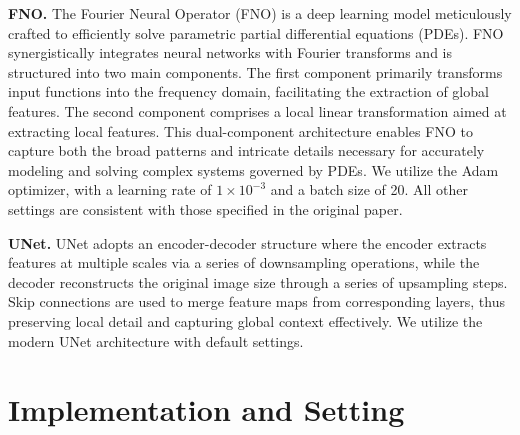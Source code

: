 \documentclass[sigconf]{acmart}
\begin{document}
\textbf{FNO.} The Fourier Neural Operator (FNO) \cite{li2020fourier} is a deep learning model meticulously crafted to efficiently solve parametric partial differential equations (PDEs). FNO synergistically integrates neural networks with Fourier transforms and is structured into two main components. The first component primarily transforms input functions into the frequency domain, facilitating the extraction of global features. The second component comprises a local linear transformation aimed at extracting local features. This dual-component architecture enables FNO to capture both the broad patterns and intricate details necessary for accurately modeling and solving complex systems governed by PDEs. We utilize the Adam optimizer, with a learning rate of $1\times 10^{-3}$ and a batch size of 20. All other settings are consistent with those specified in the original paper. 

\textbf{UNet.} UNet \cite{ronneberger2015u} adopts an encoder-decoder structure where the encoder extracts features at multiple scales via a series of downsampling operations, while the decoder reconstructs the original image size through a series of upsampling steps. Skip connections are used to merge feature maps from corresponding layers, thus preserving local detail and capturing global context effectively. We utilize the modern UNet \cite{gupta2022towards} architecture with default settings.


\section{Implementation and Setting}
\label{append-setting}
\end{document}
